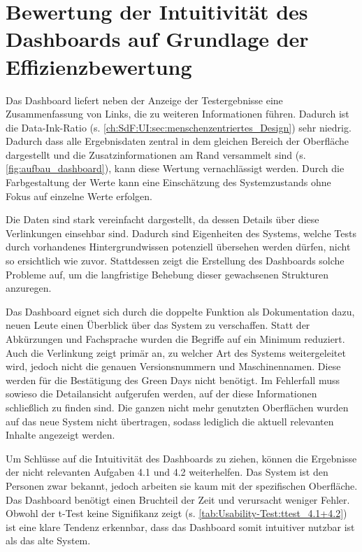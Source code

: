 \section{Bewertung der Intuitivität des Dashboards auf Grundlage der Effizienzbewertung}
\label{ch:Diskussion:Intuitivität}

Das Dashboard liefert neben der Anzeige der Testergebnisse eine Zusammenfassung von Links, die zu weiteren Informationen führen. Dadurch ist die Data-Ink-Ratio (s. \autoref{ch:SdF:UI:sec:menschenzentriertes_Design}) sehr niedrig. Dadurch dass alle Ergebnisdaten zentral in dem gleichen Bereich der Oberfläche dargestellt und die Zusatzinformationen am Rand versammelt sind (s. \autoref{fig:aufbau_dashboard}), kann diese Wertung vernachlässigt werden. Durch die Farbgestaltung der Werte kann eine Einschätzung des Systemzustands ohne Fokus auf einzelne Werte erfolgen.

Die Daten sind stark vereinfacht dargestellt, da dessen Details über diese Verlinkungen einsehbar sind. Dadurch sind Eigenheiten des Systems, welche Tests durch vorhandenes Hintergrundwissen potenziell übersehen werden dürfen, nicht so ersichtlich wie zuvor. Stattdessen zeigt die Erstellung des Dashboards solche Probleme auf, um die langfristige Behebung dieser gewachsenen Strukturen anzuregen.

Das Dashboard eignet sich durch die doppelte Funktion als Dokumentation dazu, neuen Leute einen Überblick über das System zu verschaffen. Statt der Abkürzungen und Fachsprache wurden die Begriffe auf ein Minimum reduziert. Auch die Verlinkung zeigt primär an, zu welcher Art des Systems weitergeleitet wird, jedoch nicht die genauen Versionsnummern und Maschinennamen. Diese werden für die Bestätigung des Green Days nicht benötigt. Im Fehlerfall muss sowieso die Detailansicht aufgerufen werden, auf der diese Informationen schließlich zu finden sind. Die ganzen nicht mehr genutzten Oberflächen wurden auf das neue System nicht übertragen, sodass lediglich die aktuell relevanten Inhalte angezeigt werden.

Um Schlüsse auf die Intuitivität des Dashboards zu ziehen, können die Ergebnisse der nicht relevanten Aufgaben 4.1 und 4.2 weiterhelfen. Das System ist den Personen zwar bekannt, jedoch arbeiten sie kaum mit der spezifischen Oberfläche. Das Dashboard benötigt einen Bruchteil der Zeit und verursacht weniger Fehler. Obwohl der t-Test keine Signifikanz zeigt (s. \autoref{tab:Usability-Test:ttest_4.1+4.2}) ist eine klare Tendenz erkennbar, dass das Dashboard somit intuitiver nutzbar ist als das alte System.


